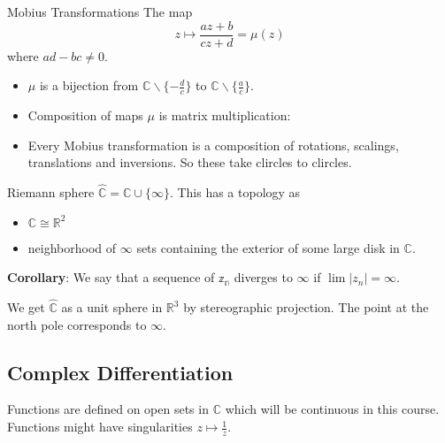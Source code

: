 \documentclass{report}
\begin{document}
\begin{definition}{Mobius Transformations}
    The map
        \begin{equation*}
            z \mapsto \dfrac{az + b}{cz + d} = \mu(z)
        \end{equation*}
    where $ad - bc \neq 0$.
\end{definition}

\begin{theorem}{}
    \begin{itemize}
        \item $\mu$ is a bijection from $\mathbb{C} \backslash \{- \frac{d}{c}\}$ to $\mathbb{C} \backslash \{\frac{a}{c}\}$. 

        \item Composition of maps $\mu$ is matrix multiplication:

        \item Every Mobius transformation  is a composition of rotations, scalings, translations and inversions. So these take clircles to clircles.
    \end{itemize}
\end{theorem}

\begin{definition}{Riemann sphere}
    $\hat{\mathbb{C}} = \mathbb{C} \cup \{ \infty\}$. This has a topology as
        \begin{itemize}
            \item $\mathbb{C} \cong \mathbb{R}^{2}$

            \item neighborhood of $\infty$ sets containing the exterior of some large disk in $\mathbb{C}$. 
        \end{itemize}
\end{definition}

\textbf{Corollary}: We say that a sequence of $\mathbb{z_{n}}$ diverges to $\infty$ if $\lim \lvert z_{n} \rvert = \infty$.

We get $\hat{\mathbb{C}}$ as a unit sphere in $\mathbb{R}^{3}$ by stereographic projection. The point at the north pole corresponds to $\infty$.


\begin{topic}
    \section{Complex Differentiation}
\end{topic}

Functions are defined on open sets in $\mathbb{C}$ which will be continuous in this course. Functions might have singularities $z \mapsto \frac{1}{z}$.
\end{document}
